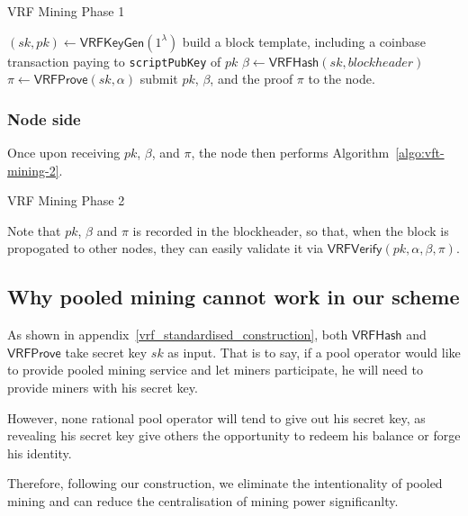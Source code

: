 \begin{algorithm}[H]
\caption{VRF Mining Phase 1}
\label{algo:vft-mining-1}
\SetAlgoLined
  $(sk, pk) \gets \mathsf{VRFKeyGen}(1^{\lambda})$\;
  build a block template, including a coinbase transaction paying to \texttt{scriptPubKey} of $pk$\;
  $\beta \gets \mathsf{VRFHash}(sk, blockheader)$\;
  $\pi \gets \mathsf{VRFProve}(sk, \alpha)$\;
  submit $pk$, $\beta$, and the proof $\pi$ to the node.
\end{algorithm}

\subsubsection{Node side\\}

Once upon receiving $pk$, $\beta$, and $\pi$, the node then performs Algorithm~\ref{algo:vft-mining-2}.

\begin{algorithm}[H]
\caption{VRF Mining Phase 2}
\label{algo:vft-mining-2}
\SetAlgoLined
{}
\end{algorithm}

Note that $pk$, $\beta$ and $\pi$ is recorded in the blockheader, so that, when the block is propogated to other nodes, they can easily validate it via $\mathsf{VRFVerify}(pk, \alpha, \beta, \pi)$.



\subsection{Why pooled mining cannot work in our scheme}
\label{sec:discourage-pool}

As shown in appendix~\ref{vrf_standardised_construction}, both $\mathsf{VRFHash}$ and $\mathsf{VRFProve}$ take secret key $sk$ as input.
That is to say, if a pool operator would like to provide pooled mining service and let miners participate, he will need to provide miners with his secret key.

However, none rational pool operator will tend to give out his secret key, as revealing his secret key give others the opportunity to redeem his balance or forge his identity.

Therefore, following our construction, we eliminate the intentionality of pooled mining and can reduce the centralisation of mining power significanlty.
